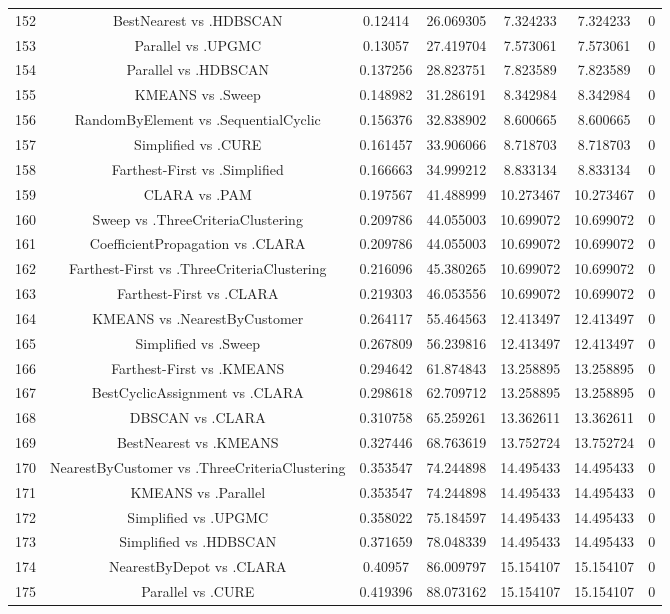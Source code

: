 \documentclass[a4paper,10pt]{article}
\begin{document}
\begin{landscape}
\begin{table}[!htp]
\begin{tabular}{ccccccc}
152&BestNearest vs .HDBSCAN&0.12414&26.069305&7.324233&7.324233&0\\
153&Parallel vs .UPGMC&0.13057&27.419704&7.573061&7.573061&0\\
154&Parallel vs .HDBSCAN&0.137256&28.823751&7.823589&7.823589&0\\
155&KMEANS vs .Sweep&0.148982&31.286191&8.342984&8.342984&0\\
156&RandomByElement vs .SequentialCyclic&0.156376&32.838902&8.600665&8.600665&0\\
157&Simplified vs .CURE&0.161457&33.906066&8.718703&8.718703&0\\
158&Farthest-First vs .Simplified&0.166663&34.999212&8.833134&8.833134&0\\
159&CLARA vs .PAM&0.197567&41.488999&10.273467&10.273467&0\\
160&Sweep vs .ThreeCriteriaClustering&0.209786&44.055003&10.699072&10.699072&0\\
161&CoefficientPropagation vs .CLARA&0.209786&44.055003&10.699072&10.699072&0\\
162&Farthest-First vs .ThreeCriteriaClustering&0.216096&45.380265&10.699072&10.699072&0\\
163&Farthest-First vs .CLARA&0.219303&46.053556&10.699072&10.699072&0\\
164&KMEANS vs .NearestByCustomer&0.264117&55.464563&12.413497&12.413497&0\\
165&Simplified vs .Sweep&0.267809&56.239816&12.413497&12.413497&0\\
166&Farthest-First vs .KMEANS&0.294642&61.874843&13.258895&13.258895&0\\
167&BestCyclicAssignment vs .CLARA&0.298618&62.709712&13.258895&13.258895&0\\
168&DBSCAN vs .CLARA&0.310758&65.259261&13.362611&13.362611&0\\
169&BestNearest vs .KMEANS&0.327446&68.763619&13.752724&13.752724&0\\
170&NearestByCustomer vs .ThreeCriteriaClustering&0.353547&74.244898&14.495433&14.495433&0\\
171&KMEANS vs .Parallel&0.353547&74.244898&14.495433&14.495433&0\\
172&Simplified vs .UPGMC&0.358022&75.184597&14.495433&14.495433&0\\
173&Simplified vs .HDBSCAN&0.371659&78.048339&14.495433&14.495433&0\\
174&NearestByDepot vs .CLARA&0.40957&86.009797&15.154107&15.154107&0\\
175&Parallel vs .CURE&0.419396&88.073162&15.154107&15.154107&0\\

\end{tabular}
\end{table}
\end{landscape}
\end{document}
